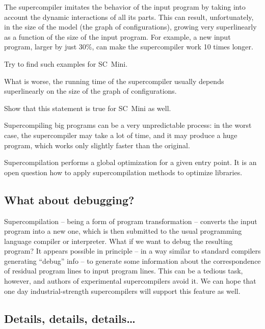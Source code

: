 The supercompiler imitates the behavior of the input program by taking into
account the dynamic interactions of all its parts.
This can result, unfortunately, in the size of the model (the graph of configurations),
growing very superlinearly as a function of the size of the input program.
For example, a new input program, larger by just 30\%, can make the
supercompiler work 10 times longer.

\begin{exercise}
Try to find such examples for SC~Mini.
\end{exercise}

What is worse, the running time of the supercompiler usually 
depends superlinearly on the size of the graph of configurations.

\begin{exercise}
Show that this statement is true for SC~Mini as well.
\end{exercise}

Supercompiling big programs can be a very unpredictable process:
in the worst case, the supercompiler may take a lot of time, and it may
produce a huge program, which works only slightly faster than the original.

Supercompilation performs a global optimization for a given entry point.
It is an open question how to apply supercompilation methods to optimize
libraries.

\subsection{What about debugging?}

Supercompilation -- being a form of program transformation -- converts the
input program into a new one, which is then submitted to the usual
programming language compiler or interpreter.
What if we want to debug the resulting program?
It appears possible in principle -- in a way similar to
standard compilers generating ``debug'' info --
to generate some information about the correspondence of
residual program lines to input program lines.
This can be a tedious task, however, and
authors of experimental supercompilers avoid it.
We can hope that one day industrial-strength supercompilers
will support this feature as well.

\subsection{Details, details, details\ldots}

